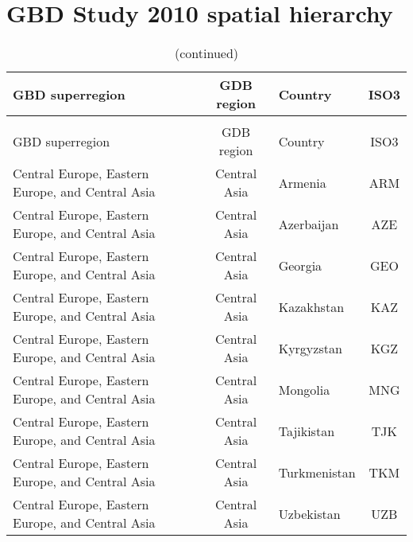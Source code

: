 \chapter{GBD Study 2010 spatial hierarchy}
\label{appendix-hierarchy}

\begin{landscape}
\begin{longtable}{|p{6cm}|c|p{5cm}|c|}
\caption[]{Spatial hierarchy used in the GBD Study 2010}\\

\hline
\hline
         GBD superregion &                   GDB region &                                  Country & ISO3 \\
\hline
\endfirsthead
\caption[]{(continued)}\\
\hline
         GBD superregion &                   GDB region &                                  Country & ISO3 \\
\hline
\endhead
\hline
\endfoot
\hline
\hline
\endlastfoot
\raggedright Central Europe, Eastern Europe, and Central Asia &                 Central Asia &                                           Armenia &  ARM \\
\raggedright Central Europe, Eastern Europe, and Central Asia &                 Central Asia &                                        Azerbaijan &  AZE \\
\raggedright Central Europe, Eastern Europe, and Central Asia &                 Central Asia &                                           Georgia &  GEO \\
\raggedright Central Europe, Eastern Europe, and Central Asia &                 Central Asia &                                        Kazakhstan &  KAZ \\
\raggedright Central Europe, Eastern Europe, and Central Asia &                 Central Asia &                                        Kyrgyzstan &  KGZ \\
\raggedright Central Europe, Eastern Europe, and Central Asia &                 Central Asia &                                          Mongolia &  MNG \\
\raggedright Central Europe, Eastern Europe, and Central Asia &                 Central Asia &                                        Tajikistan &  TJK \\
\raggedright Central Europe, Eastern Europe, and Central Asia &                 Central Asia &                                      Turkmenistan &  TKM \\
\raggedright Central Europe, Eastern Europe, and Central Asia &                 Central Asia &                                        Uzbekistan &  UZB \\

\end{longtable}
\end{landscape}
